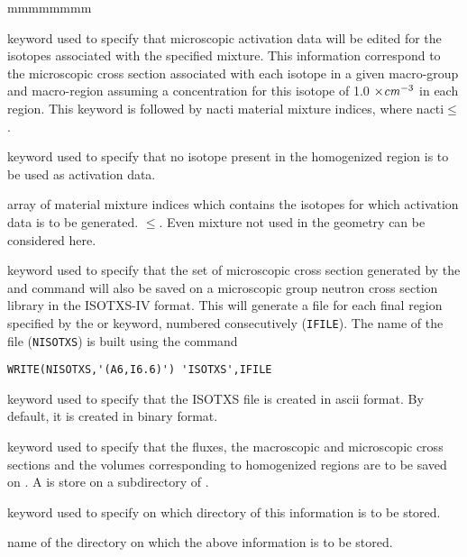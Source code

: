 \begin{ListeDeDescription}{mmmmmmmm}
\item[\moc{ACTI}] keyword used to specify that microscopic activation
data will be edited for the isotopes associated with the specified mixture. This
information correspond to the microscopic cross section associated with each
isotope in a given macro-group and macro-region assuming a concentration
for this isotope of 1.0 $\times{\it cm}^{-3}$ in each region. This keyword is
followed by nacti material mixture indices, where
nacti$\le$.

\item[\moc{NONE}] keyword used to specify that no isotope present in the
homogenized region is to be used as activation data.

\item[\dusa{imixa}] array of material mixture indices which contains the
isotopes for which activation data is to be generated.
$\le$. Even mixture not used in the geometry 
can be considered here.

\item[\moc{ISOTXS}] keyword used to specify that the set of microscopic cross
section generated by the  and  command will also
be saved on a microscopic group neutron cross section library in the ISOTXS-IV
format. This will generate a file for each final region specified by the
 or  keyword, numbered consecutively ({\tt IFILE}). The name
of the file ({\tt NISOTXS}) is built using the command 

\begin{verbatim}
WRITE(NISOTXS,'(A6,I6.6)') 'ISOTXS',IFILE
\end{verbatim}

\item[\moc{ASCII}] keyword used to specify that the ISOTXS file is created in ascii format.
By  default, it is created in binary format.

\item[\moc{SAVE}] keyword used to specify that the fluxes, the macroscopic and
microscopic cross sections and the volumes corresponding to homogenized regions
are to be saved on . A  is store on a subdirectory
of .

\item[\moc{ON}] keyword used to specify on which directory of  this
information is to be stored.

\item[\dusa{DIRN}] name of the directory on which the above information is to
be stored.


\end{ListeDeDescription}
